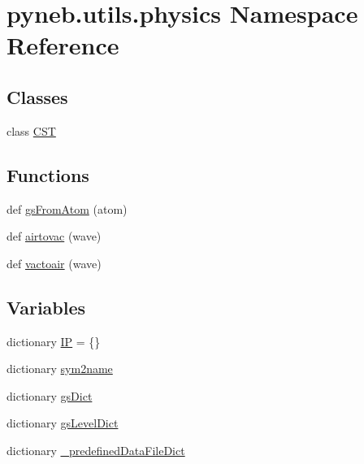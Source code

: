 \hypertarget{namespacepyneb_1_1utils_1_1physics}{}\section{pyneb.\+utils.\+physics Namespace Reference}
\label{namespacepyneb_1_1utils_1_1physics}
\subsection*{Classes}
\begin{DoxyCompactItemize}
\item 
class \hyperlink{classpyneb_1_1utils_1_1physics_1_1_c_s_t}{C\+S\+T}
\end{DoxyCompactItemize}
\subsection*{Functions}
\begin{DoxyCompactItemize}
\item 
def \hyperlink{namespacepyneb_1_1utils_1_1physics_affea300d5f6d64b440b7363755a67cef}{gs\+From\+Atom} (atom)
\item 
def \hyperlink{namespacepyneb_1_1utils_1_1physics_a75304d89e533b2199decec697f90c9a4}{airtovac} (wave)
\item 
def \hyperlink{namespacepyneb_1_1utils_1_1physics_aafb02f69e32ab62fa89420481f9a65f4}{vactoair} (wave)
\end{DoxyCompactItemize}
\subsection*{Variables}
\begin{DoxyCompactItemize}
\item 
dictionary \hyperlink{namespacepyneb_1_1utils_1_1physics_a98382f08784fe7d142ec0758017c4117}{I\+P} = \{\}
\item 
dictionary \hyperlink{namespacepyneb_1_1utils_1_1physics_a9d07f39b9983e7918a815f905b0a6de1}{sym2name}
\item 
dictionary \hyperlink{namespacepyneb_1_1utils_1_1physics_ab143ee5cc76a192f8c1811837c142d19}{gs\+Dict}
\item 
dictionary \hyperlink{namespacepyneb_1_1utils_1_1physics_aab0d46710f5ecaa54ca513608a58299f}{gs\+Level\+Dict}
\item 
dictionary \hyperlink{namespacepyneb_1_1utils_1_1physics_a78612b3baa31d8b1afffc83fa7e63117}{\+\_\+predefined\+Data\+File\+Dict}
\end{DoxyCompactItemize}


